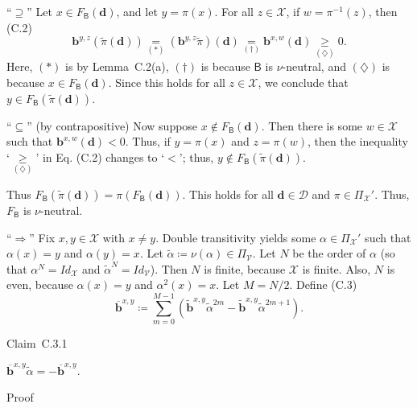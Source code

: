 \documentclass[
]{article}
\begin{document}
``\(\supseteq\)'' Let \(x \in F_{\mathsf{B}}\left( \mathbf{d} \right)\),
and let \(y = \pi(x)\). For all \(z \in \mathcal{X}\), if
\(w = \pi^{- 1}(z)\), then
(C.2)\[\mathbf{b}^{y,z}\left( \widetilde{\pi}\left( \mathbf{d} \right) \right)\underset{( \ast )}{=}\left( \mathbf{b}^{y,z}\widetilde{\pi} \right)\left( \mathbf{d} \right)\underset{( \dagger )}{=}\mathbf{b}^{x,w}\left( \mathbf{d} \right)\underset{(\diamondsuit)}{\geq}0\text{.}\]
Here, \(( \ast )\) is by Lemma~C.2(a), \(( \dagger )\) is because
\(\mathsf{B}\) is \(\nu\)-neutral, and \((\diamondsuit)\) is because
\(x \in F_{\mathsf{B}}\left( \mathbf{d} \right)\). Since this holds for
all \(z \in \mathcal{X}\), we conclude that
\(y \in F_{\mathsf{B}}\left( \widetilde{\pi}\left( \mathbf{d} \right) \right)\).

``\(\subseteq\)'' (by contrapositive) Now suppose
\(x \notin F_{\mathsf{B}}\left( \mathbf{d} \right)\). Then there is some
\(w \in \mathcal{X}\) such that
\(\mathbf{b}^{x,w}\left( \mathbf{d} \right) < 0\). Thus, if
\(y = \pi(x)\) and \(z = \pi(w)\), then the inequality
`\(\underset{(\diamondsuit)}{\geq}\)' in Eq. (C.2) changes to `\(<\)';
thus,
\(y \notin F_{\mathsf{B}}\left( \widetilde{\pi}\left( \mathbf{d} \right) \right)\).

Thus
\(F_{\mathsf{B}}\left( \widetilde{\pi}\left( \mathbf{d} \right) \right) = \pi\left( F_{\mathsf{B}}\left( \mathbf{d} \right) \right)\).
This holds for all \(\mathbf{d} \in \mathcal{D}\) and
\(\pi \in \Pi_{\mathcal{X}}'\). Thus, \(F_{\mathsf{B}}\) is
\(\nu\)-neutral.

``\(\Longrightarrow\)'' Fix \(x,y \in \mathcal{X}\) with \(x \neq y\).
Double transitivity yields some \(\alpha \in \Pi_{\mathcal{X}}'\) such
that \(\alpha(x) = y\) and \(\alpha(y) = x\). Let
\(\widetilde{\alpha} ≔ \nu(\alpha) \in \Pi_{\mathcal{V}}\). Let \(N\) be
the order of \(\alpha\) (so that \(\alpha^{N} = {Id}_{\mathcal{X}}\) and
\({\widetilde{\alpha}}^{N} = {Id}_{\mathcal{V}}\)). Then \(N\) is
finite, because \(\mathcal{X}\) is finite. Also, \(N\) is even, because
\(\alpha(x) = y\) and \(\alpha^{2}(x) = x\). Let \(M = N/2\). Define
(C.3)\[{\overline{\mathbf{b}}}^{x,y} ≔ \sum\limits_{m = 0}^{M - 1}\left( {\widetilde{\mathbf{b}}}^{x,y}{\widetilde{\alpha}}^{2m} - {\widetilde{\mathbf{b}}}^{x,y}{\widetilde{\alpha}}^{2m + 1} \right)\text{.}\]

Claim~C.3.1

\({\overline{\mathbf{b}}}^{x,y}\widetilde{\alpha} = - {\overline{\mathbf{b}}}^{x,y}\).

Proof
\end{document}
